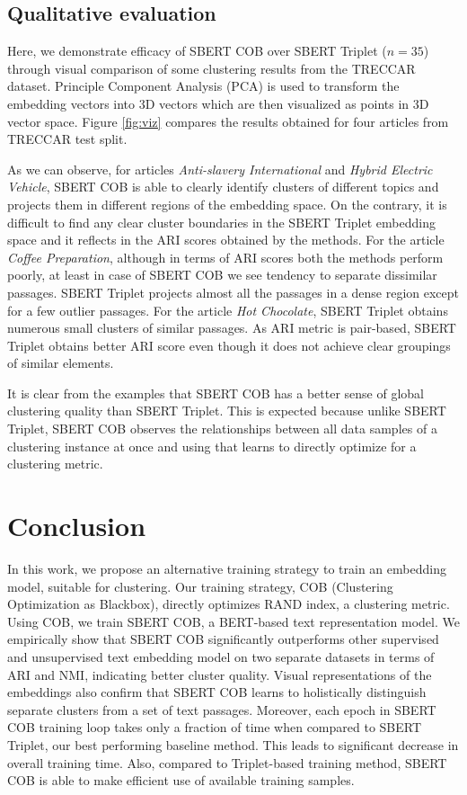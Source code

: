 \documentclass[11pt,a4paper]{article}
\begin{document}
\subsection{Qualitative evaluation} Here, we demonstrate efficacy of SBERT COB over SBERT Triplet ($n=35$) through visual comparison of some clustering results from the TRECCAR dataset. Principle Component Analysis (PCA) is used to transform the embedding vectors into 3D vectors which are then visualized as points in 3D vector space. Figure \ref{fig:viz} compares the results obtained for four articles from TRECCAR test split.

As we can observe, for articles \textit{Anti-slavery International} and \textit{Hybrid Electric Vehicle}, SBERT COB is able to clearly identify clusters of different topics and projects them in different regions of the embedding space. On the contrary, it is difficult to find any clear cluster boundaries in the SBERT Triplet embedding space and it reflects in the ARI scores obtained by the methods. For the article \textit{Coffee Preparation}, although in terms of ARI scores both the methods perform poorly, at least in case of SBERT COB we see tendency to separate dissimilar passages. SBERT Triplet projects almost all the passages in a dense region except for a few outlier passages. For the article \textit{Hot Chocolate}, SBERT Triplet obtains numerous small clusters of similar passages. As ARI metric is pair-based, SBERT Triplet obtains better ARI score even though it does not achieve clear groupings of similar elements.

It is clear from the examples that SBERT COB has a better sense of global clustering quality than SBERT Triplet. This is expected because unlike SBERT Triplet, SBERT COB observes the relationships between all data samples of a clustering instance at once and using that learns to directly optimize for a clustering metric. %

\section{Conclusion} In this work, we propose an alternative training strategy to train an embedding model, suitable for clustering. Our training strategy, COB (Clustering Optimization as Blackbox), directly optimizes RAND index, a clustering metric. Using COB, we train SBERT COB, a BERT-based text representation model. We empirically show that SBERT COB significantly outperforms other supervised and unsupervised text embedding model on two separate datasets in terms of ARI and NMI, indicating better cluster quality. Visual representations of the embeddings also confirm that SBERT COB learns to holistically distinguish separate clusters from a set of text passages. Moreover, each epoch in SBERT COB training loop takes only a fraction of time when compared to SBERT Triplet, our best performing baseline method. This leads to significant decrease in overall training time. Also, compared to Triplet-based training method, SBERT COB is able to make efficient use of available training samples.




\end{document}
